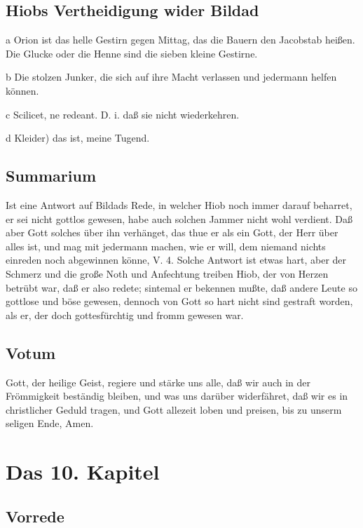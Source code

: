 \section{Hiobs Vertheidigung wider Bildad}

a Orion ist das helle Gestirn gegen Mittag, das die Bauern den Jacobstab heißen. Die Glucke oder die Henne sind die sieben kleine Gestirne.

b Die stolzen Junker, die sich auf ihre Macht verlassen und jedermann helfen können.

c Scilicet, ne redeant. D. i. daß sie nicht wiederkehren.

d Kleider) das ist, meine Tugend.

\section{Summarium}

Ist eine Antwort auf Bildads Rede, in welcher Hiob noch immer darauf beharret, er sei nicht gottlos gewesen, habe auch solchen Jammer nicht wohl verdient. Daß aber Gott solches über ihn verhänget, das thue er als ein Gott, der Herr über alles ist, und mag mit jedermann machen, wie er will, dem niemand nichts einreden noch abgewinnen könne, V. 4. Solche Antwort ist etwas hart, aber der Schmerz und die große Noth und Anfechtung treiben Hiob, der von Herzen betrübt war, daß er also redete; sintemal er bekennen mußte, daß andere Leute so gottlose und böse gewesen, dennoch von Gott so hart nicht sind gestraft worden, als er, der doch gottesfürchtig und fromm gewesen war.

\section{Votum}

Gott, der heilige Geist, regiere und stärke uns alle, daß wir auch in der Frömmigkeit beständig bleiben, und was uns darüber widerfähret, daß wir es in christlicher Geduld tragen, und Gott allezeit loben und preisen, bis zu unserm seligen Ende, Amen.

\chapter{Das 10. Kapitel}

\section{Vorrede}

